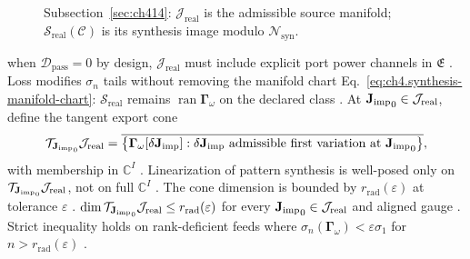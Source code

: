 \begin{figure}[t]
\centering
{}
\caption{Subsection~\ref{sec:ch414}: \(\mathcal{J}_{\mathrm{real}}\) is the admissible source manifold;
\(\mathcal{S}_{\mathrm{real}}(\mathcal{C})\) is its synthesis image modulo \(\mathcal{N}_{\mathrm{syn}}\).}
\label{fig:ch4.realizable-source-manifold}
\end{figure}
when \(\mathcal{D}_{\mathrm{pass}}=0\) by design, \(\mathcal{J}_{\mathrm{real}}\) must include explicit port power
channels in \(\mathfrak{E}\) \cite{harrington2001}. Loss modifies \(\sigma_{n}\) tails without removing
the manifold chart Eq.~\eqref{eq:ch4.synthesis-manifold-chart}: $\mathcal{S}_{\mathrm{real}}$ remains
\(\operatorname{ran}\boldsymbol{\Gamma}_\omega\) on the declared class \cite{stratton1941}.
At \({\mathbf{J}_{\mathrm{imp}}}_{0}\in\mathcal{J}_{\mathrm{real}}\), define the tangent export cone
\begin{equation}
\label{eq:ch4.tangent-export-cone}
\mathcal{T}_{{\mathbf{J}_{\mathrm{imp}}}_{0}}\mathcal{J}_{\mathrm{real}}
=
\overline{\big\{
\boldsymbol{\Gamma}_\omega[\delta\mathbf{J}_{\mathrm{imp}}]:
\delta\mathbf{J}_{\mathrm{imp}}\ \text{admissible first variation at}\ {\mathbf{J}_{\mathrm{imp}}}_{0}
\big\}},
\end{equation}
with membership in \(\mathbb{C}^{I}\) \cite{stratton1941}. Linearization of pattern synthesis is
well-posed only on \(\mathcal{T}_{{\mathbf{J}_{\mathrm{imp}}}_{0}}\mathcal{J}_{\mathrm{real}}\), not on full \(\mathbb{C}^{I}\)
\cite{hansen1988}. The cone dimension is bounded by \(r_{\mathrm{rad}}(\varepsilon)\) at tolerance \(\varepsilon\)
\cite{harrington2001}.
\label{prop:ch4.tangent-dimension}
\(\dim\mathcal{T}_{{\mathbf{J}_{\mathrm{imp}}}_{0}}\mathcal{J}_{\mathrm{real}}\le r_{\mathrm{rad}}(\varepsilon)\) for every
\({\mathbf{J}_{\mathrm{imp}}}_{0}\in\mathcal{J}_{\mathrm{real}}\) and aligned gauge \cite{stratton1941}. Strict
inequality holds on rank-deficient feeds where \(\sigma_{n}(\boldsymbol{\Gamma}_\omega)<\varepsilon\sigma_{1}\) for
\(n>r_{\mathrm{rad}}(\varepsilon)\) \cite{hansen1988}.

